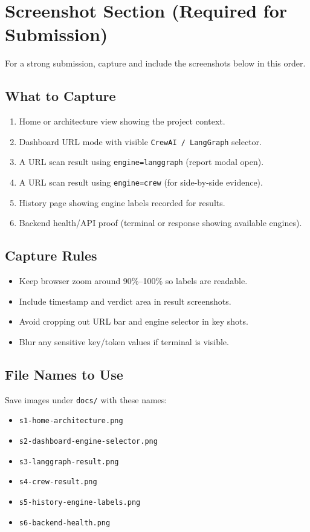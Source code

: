 \documentclass[11pt,a4paper]{article}
\begin{document}
\section{Screenshot Section (Required for Submission)}
For a strong submission, capture and include the screenshots below in this order.

\subsection*{What to Capture}
\begin{enumerate}[leftmargin=1.5em]
  \item Home or architecture view showing the project context.
  \item Dashboard URL mode with visible \texttt{CrewAI / LangGraph} selector.
  \item A URL scan result using \texttt{engine=langgraph} (report modal open).
  \item A URL scan result using \texttt{engine=crew} (for side-by-side evidence).
  \item History page showing engine labels recorded for results.
  \item Backend health/API proof (terminal or response showing available engines).
\end{enumerate}

\subsection*{Capture Rules}
\begin{itemize}[leftmargin=1.25em]
  \item Keep browser zoom around 90\%--100\% so labels are readable.
  \item Include timestamp and verdict area in result screenshots.
  \item Avoid cropping out URL bar and engine selector in key shots.
  \item Blur any sensitive key/token values if terminal is visible.
\end{itemize}

\subsection*{File Names to Use}
Save images under \texttt{docs/} with these names:
\begin{itemize}[leftmargin=1.25em]
  \item \texttt{s1-home-architecture.png}
  \item \texttt{s2-dashboard-engine-selector.png}
  \item \texttt{s3-langgraph-result.png}
  \item \texttt{s4-crew-result.png}
  \item \texttt{s5-history-engine-labels.png}
  \item \texttt{s6-backend-health.png}
\end{itemize}
\end{document}
